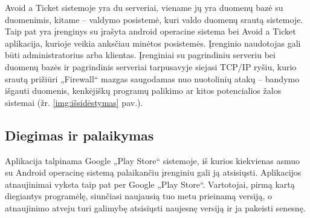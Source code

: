 \documentclass{VUMIFPSkursinis}
\begin{document}
Avoid a Ticket sistemoje yra du serveriai, viename jų yra duomenų bazė su duomenimis, kitame – valdymo posistemė, kuri valdo duomenų srautą sistemoje. Taip pat yra
įrenginys su įrašyta android operacine sistema bei Avoid a Ticket aplikacija, kurioje veikia anksčiau minėtos posistemės. Įrenginio naudotojas gali būti administratorius arba klientas. Įrenginiai su pagrindiniu serveriu bei duomenų bazės ir pagrindinis serveriai tarpusavyje siejasi TCP/IP ryšiu, kurio srautą prižiūri „Firewall“ mazgas saugodamas nuo nuotolinių atakų – bandymo išgauti duomenis, kenkėjiškų programų palikimo ar kitos potencialios žalos sistemai (žr. \ref{img:išsidėstymas} pav.).

\subsection{Diegimas ir palaikymas}

Aplikacija talpinama Google „Play Store“ sistemoje, iš kurios kiekvienas asmuo su Android operacinę sistemą palaikančiu įrenginiu gali ją atsisiųsti. Aplikacijos atnaujinimai vyksta taip pat per Google „Play Store“. Vartotojai, pirmą kartą diegiantys programėlę, siunčiasi naujausią tuo metu prieinamą versiją, o atnaujinimo atveju turi galimybę atsisiųsti naujesnę
versiją ir ja pakeisti senesnę.
\end{document}
